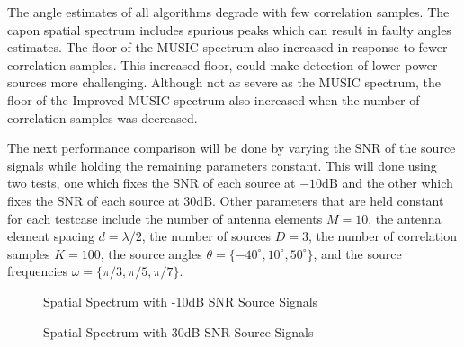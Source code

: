 \documentclass[conference]{IEEEtran}
\begin{document}
		The angle estimates of all algorithms degrade with few correlation samples. The capon spatial spectrum includes spurious peaks which can result in faulty angles estimates. The floor of the MUSIC spectrum also increased in response to fewer correlation samples. This increased floor, could make detection of lower power sources more challenging. Although not as severe as the MUSIC spectrum, the floor of the Improved-MUSIC spectrum also increased when the number of correlation samples was decreased.
		 		 
		The next performance comparison will be done by varying the SNR of the source signals while holding the remaining parameters constant. This will done using two tests, one which fixes the SNR of each source at $-10\text{dB}$ and the other which fixes the SNR of each source at $30 \text{dB}$. Other parameters that are held constant for each testcase include the number of antenna elements $M=10$, the antenna element spacing $d=\lambda/2$, the number of sources $D=3$, the number of correlation samples $K=100$, the source angles $\theta = \{-40^{\circ}, 10^{\circ}, 50^{\circ}\}$, and the source frequencies $\omega = \{\pi/3, \pi/5, \pi/7\}$.
		
		\begin{figure}[H]
			\centerline{}
			\caption{Spatial Spectrum with -10dB SNR Source Signals}
			\label{fig::spatial_spectrum_snr_minus_10db}
		\end{figure}
		
		\begin{figure}[H]
			\centerline{}
			\caption{Spatial Spectrum with 30dB SNR Source Signals}
			\label{fig::spatial_spectrum_snr_30db}
		\end{figure}
		
\end{document}
